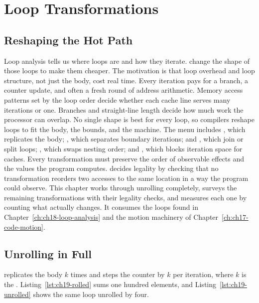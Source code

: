 \chapter{Loop Transformations}
\label{ch:ch19-loop-transformations}

\section{Reshaping the Hot Path}
\label{sec:ch19-reshaping}

Loop analysis tells us where loops are and how they iterate.
 change the shape of those loops to make them cheaper.
The motivation is that loop overhead and loop structure, not just the body, cost real time.
Every iteration pays for a branch, a counter update, and often a fresh round of address arithmetic.
Memory access patterns set by the loop order decide whether each cache line serves many iterations or one.
Branches and straight-line length decide how much work the processor can overlap.
No single shape is best for every loop, so compilers reshape loops to fit the body, the bounds, and the machine.
The menu includes , which replicates the body; , which separates boundary iterations;  and , which join or split loops; , which swaps nesting order; and , which blocks iteration space for caches.
Every transformation must preserve the order of observable effects and the values the program computes.
 decides legality by checking that no transformation reorders two accesses to the same location in a way the program could observe.
This chapter works through unrolling completely, surveys the remaining transformations with their legality checks, and measures each one by counting what actually changes.
It consumes the loops found in Chapter~\ref{ch:ch18-loop-analysis} and the motion machinery of Chapter~\ref{ch:ch17-code-motion}.

\section{Unrolling in Full}
\label{sec:ch19-unrolling}

 replicates the body $k$ times and steps the counter by $k$ per iteration, where $k$ is the .
Listing~\ref{lst:ch19-rolled} sums one hundred elements, and Listing~\ref{lst:ch19-unrolled} shows the same loop unrolled by four.

